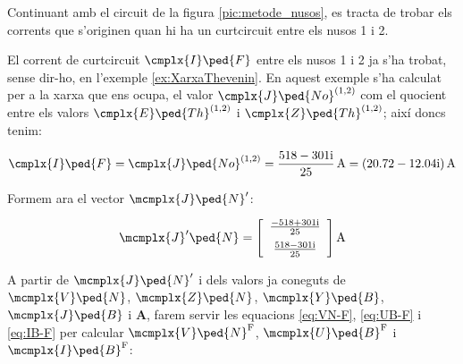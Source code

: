 \begin{exemple}\label{ex:CurtcircuitXarxaComplexa}
	\addcontentsxms{\CurtcircuitXarxaComplexa}	
	Continuant amb el circuit de la figura \vref{pic:metode_nusos}, es
	tracta de trobar els corrents que s'originen quan hi ha un curtcircuit entre els nusos 1 i 2.
	
	El corrent de curtcircuit $\cmplx{I}\ped{F}$ entre els nusos 1 i 2 ja s'ha trobat, sense dir-ho, en l'exemple \ref{ex:XarxaThevenin}. En aquest exemple s'ha calculat per a la xarxa que ens ocupa, el valor $\cmplx{J}\ped{No}^{(1,2)}$ com el quocient entre els valors $\cmplx{E}\ped{Th}^{(1,2)}$ i $\cmplx{Z}\ped{Th}^{(1,2)}$;  així doncs tenim:
	
	\[
		\cmplx{I}\ped{F} = \cmplx{J}\ped{No}^{(1,2)} =  \frac{\complexnum{518-j301}}{25}\,\unit{A} = \complexqty{20.72-j12.04}{A}
	\]

    Formem ara el vector $\mcmplx{J}\ped{N}'$:

	\[
	\mcmplx{J}'\ped{N} =
	\begin{bmatrix}\begin{array}{c}
        \frac{\complexnum{-518+j301}}{25} \\[2mm]
        \frac{\complexnum{518-j301}}{25}
	\end{array}\end{bmatrix}\unit{A}
	\]

    A partir de $\mcmplx{J}\ped{N}'$ i dels valors ja coneguts de $\mcmplx{V}\ped{N}$, $\mcmplx{Z}\ped{N}$, $\mcmplx{Y}\ped{B}$, $\mcmplx{J}\ped{B}$ i $\boldsymbol{A}$, farem servir les equacions \eqref{eq:VN-F}, \eqref{eq:UB-F} i \eqref{eq:IB-F} per calcular $\mcmplx{V}\ped{N}^{\text{F}}$, $\mcmplx{U}\ped{B}^{\text{F}}$ i $\mcmplx{I}\ped{B}^{\text{F}}$:


\end{exemple}
